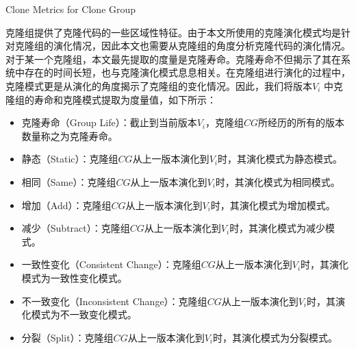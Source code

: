{Clone Metrics for Clone Group}

克隆组提供了克隆代码的一些区域性特征。由于本文所使用的克隆演化模式均是针对克隆组的演化情况，因此本文也需要从克隆组的角度分析克隆代码的演化情况。
对于某一个克隆组，本文最先提取的度量是克隆寿命。克隆寿命不但揭示了其在系统中存在的时间长短，也与克隆演化模式息息相关。在克隆组进行演化的过程中，克隆模式更是从演化的角度揭示了克隆组的变化情况。因此，我们将版本$V_i $ 中克隆组的寿命和克隆模式提取为度量值，如下所示：
\begin{itemize}
\item
克隆寿命（Group Life）：截止到当前版本$V_ i $，克隆组$CG$所经历的所有的版本数量称之为克隆寿命。
\item
静态（Static）：克隆组$CG$从上一版本演化到$V_ i $时，其演化模式为静态模式。
\item
相同（Same）：克隆组$CG$从上一版本演化到$V_ i $时，其演化模式为相同模式。
\item
增加（Add）：克隆组$CG$从上一版本演化到$V_ i $时，其演化模式为增加模式。
\item
减少（Subtract）：克隆组$CG$从上一版本演化到$V_ i $时，其演化模式为减少模式。
\item
一致性变化（Consistent Change）：克隆组$CG$从上一版本演化到$V_ i $时，其演化模式为一致性变化模式。
\item
不一致变化（Inconsistent Change）：克隆组$CG$从上一版本演化到$V_ i $时，其演化模式为不一致变化模式。
\item
分裂（Split）：克隆组$CG$从上一版本演化到$V_ i $时，其演化模式为分裂模式。
\end{itemize}


